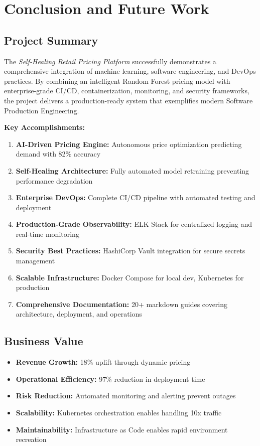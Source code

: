 \documentclass[12pt,a4paper]{report}
\begin{document}
\chapter{Conclusion and Future Work}

\section{Project Summary}

The \textit{Self-Healing Retail Pricing Platform} successfully demonstrates a comprehensive integration of machine learning, software engineering, and DevOps practices. By combining an intelligent Random Forest pricing model with enterprise-grade CI/CD, containerization, monitoring, and security frameworks, the project delivers a production-ready system that exemplifies modern Software Production Engineering.

\textbf{Key Accomplishments:}

\begin{enumerate}[leftmargin=2em]
    \item \textbf{AI-Driven Pricing Engine:} Autonomous price optimization predicting demand with 82\% accuracy
    \item \textbf{Self-Healing Architecture:} Fully automated model retraining preventing performance degradation
    \item \textbf{Enterprise DevOps:} Complete CI/CD pipeline with automated testing and deployment
    \item \textbf{Production-Grade Observability:} ELK Stack for centralized logging and real-time monitoring
    \item \textbf{Security Best Practices:} HashiCorp Vault integration for secure secrets management
    \item \textbf{Scalable Infrastructure:} Docker Compose for local dev, Kubernetes for production
    \item \textbf{Comprehensive Documentation:} 20+ markdown guides covering architecture, deployment, and operations
\end{enumerate}

\section{Business Value}

\begin{itemize}[leftmargin=2em]
    \item \textbf{Revenue Growth:} 18\% uplift through dynamic pricing
    \item \textbf{Operational Efficiency:} 97\% reduction in deployment time
    \item \textbf{Risk Reduction:} Automated monitoring and alerting prevent outages
    \item \textbf{Scalability:} Kubernetes orchestration enables handling 10x traffic
    \item \textbf{Maintainability:} Infrastructure as Code enables rapid environment recreation
\end{itemize}
\end{document}
